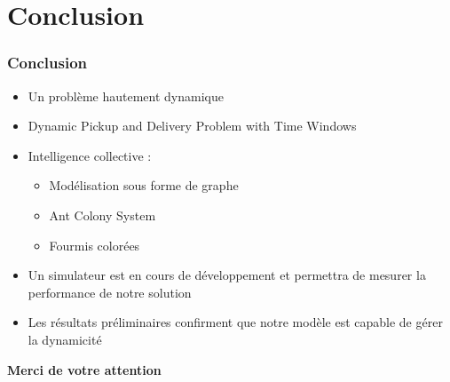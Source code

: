 \documentclass{beamer}
\begin{document}
\section{Conclusion}
\begin{frame}
 \frametitle{Conclusion}
	\begin{itemize}
	 \item Un problème hautement dynamique
	 \item Dynamic Pickup and Delivery Problem with Time Windows
	 \item Intelligence collective :
	 \begin{itemize}
		\item Modélisation sous forme de graphe
		\item Ant Colony System
		\item Fourmis colorées
	\end{itemize}
	 \item Un simulateur est en cours de développement et permettra de mesurer la performance de notre solution
	 \item Les résultats préliminaires confirment que notre modèle est capable de gérer la dynamicité
	\end{itemize}

	\pause
	\begin{center}
		\textbf{Merci de votre attention}
	\end{center}
\end{frame}
\tiny


% 
% 
\end{document}
